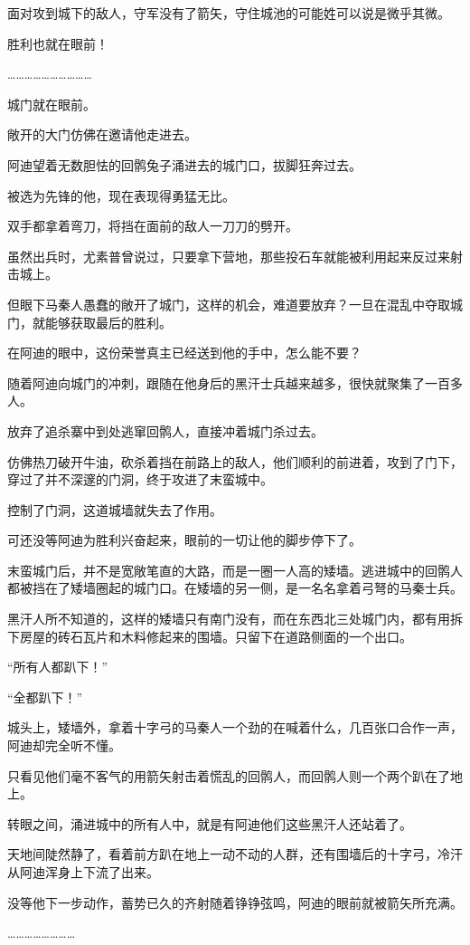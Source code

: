 面对攻到城下的敌人，守军没有了箭矢，守住城池的可能姓可以说是微乎其微。

胜利也就在眼前！

…………………………

城门就在眼前。

敞开的大门仿佛在邀请他走进去。

阿迪望着无数胆怯的回鹘兔子涌进去的城门口，拔脚狂奔过去。

被选为先锋的他，现在表现得勇猛无比。

双手都拿着弯刀，将挡在面前的敌人一刀刀的劈开。

虽然出兵时，尤素普曾说过，只要拿下营地，那些投石车就能被利用起来反过来射击城上。

但眼下马秦人愚蠢的敞开了城门，这样的机会，难道要放弃？一旦在混乱中夺取城门，就能够获取最后的胜利。

在阿迪的眼中，这份荣誉真主已经送到他的手中，怎么能不要？

随着阿迪向城门的冲刺，跟随在他身后的黑汗士兵越来越多，很快就聚集了一百多人。

放弃了追杀寨中到处逃窜回鹘人，直接冲着城门杀过去。

仿佛热刀破开牛油，砍杀着挡在前路上的敌人，他们顺利的前进着，攻到了门下，穿过了并不深邃的门洞，终于攻进了末蛮城中。

控制了门洞，这道城墙就失去了作用。

可还没等阿迪为胜利兴奋起来，眼前的一切让他的脚步停下了。

末蛮城门后，并不是宽敞笔直的大路，而是一圈一人高的矮墙。逃进城中的回鹘人都被挡在了矮墙圈起的城门口。在矮墙的另一侧，是一名名拿着弓弩的马秦士兵。

黑汗人所不知道的，这样的矮墙只有南门没有，而在东西北三处城门内，都有用拆下房屋的砖石瓦片和木料修起来的围墙。只留下在道路侧面的一个出口。

“所有人都趴下！”

“全都趴下！”

城头上，矮墙外，拿着十字弓的马秦人一个劲的在喊着什么，几百张口合作一声，阿迪却完全听不懂。

只看见他们毫不客气的用箭矢射击着慌乱的回鹘人，而回鹘人则一个两个趴在了地上。

转眼之间，涌进城中的所有人中，就是有阿迪他们这些黑汗人还站着了。

天地间陡然静了，看着前方趴在地上一动不动的人群，还有围墙后的十字弓，冷汗从阿迪浑身上下流了出来。

没等他下一步动作，蓄势已久的齐射随着铮铮弦鸣，阿迪的眼前就被箭矢所充满。

……………………

